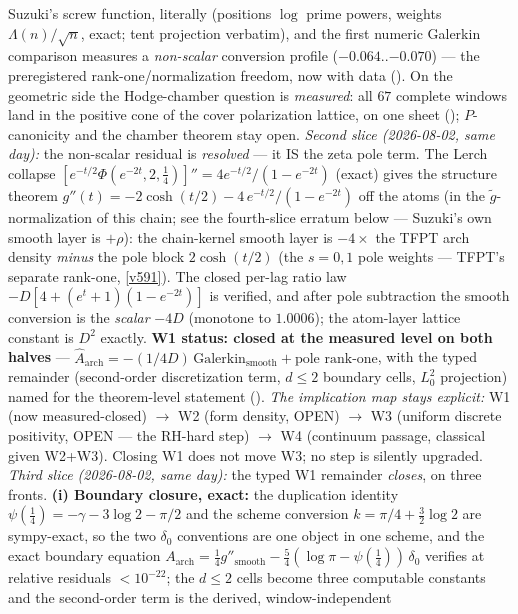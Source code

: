 Suzuki's screw function, literally (positions $\log$ prime powers,
weights $\Lambda(n)/\sqrt n$, exact; tent projection verbatim), and
the first numeric Galerkin comparison measures a \emph{non-scalar}
conversion profile ($-0.064..{-0.070}$) --- the preregistered
rank-one/normalization freedom, now with data
().  On the geometric side the
Hodge-chamber question is \emph{measured}: all $67$ complete windows
land in the positive cone of the cover polarization lattice, on one
sheet (); $P$-canonicity and the chamber
theorem stay open.
\emph{Second slice (2026-08-02, same day):} the non-scalar residual is
\emph{resolved} --- it IS the zeta pole term.  The Lerch collapse
$[e^{-t/2}\Phi(e^{-2t},2,\tfrac14)]''=4e^{-t/2}/(1-e^{-2t})$ (exact)
gives the structure theorem $g''(t)=-2\cosh(t/2)-4\,e^{-t/2}/(1-e^{-2t})$
off the atoms (in the $\tilde g$-normalization of this chain; see the
fourth-slice erratum below --- Suzuki's own smooth layer is $+\rho$):
the chain-kernel smooth layer is $-4\times$ the TFPT arch
density \emph{minus} the pole block $2\cosh(t/2)$ (the $s=0,1$ pole
weights --- TFPT's separate rank-one, \vref{v591}).  The closed
per-lag ratio law $-D[4+(e^t{+}1)(1-e^{-2t})]$ is verified, and after
pole subtraction the smooth conversion is the \emph{scalar} $-4D$
(monotone to $1.0006$); the atom-layer lattice constant is $D^2$
exactly.  \textbf{W1 status: closed at the measured level on both
halves} --- $\widehat A_{\mathrm{arch}} = -(1/4D)\,
\mathrm{Galerkin}_{\mathrm{smooth}} + \text{pole rank-one}$, with the
typed remainder (second-order discretization term, $d\le2$ boundary
cells, $L^2_0$ projection) named for the theorem-level statement
().  \emph{The implication map stays
explicit:} W1 (now measured-closed) $\to$ W2 (form density, OPEN) $\to$
W3 (uniform discrete positivity, OPEN --- the RH-hard step) $\to$ W4
(continuum passage, classical given W2+W3).  Closing W1 does not move
W3; no step is silently upgraded.
\emph{Third slice (2026-08-02, same day):} the typed W1 remainder
\emph{closes}, on three fronts.  \textbf{(i) Boundary closure, exact:}
the duplication identity $\psi(\tfrac14)=-\gamma-3\log2-\pi/2$ and the
scheme conversion $k=\pi/4+\tfrac32\log2$ are sympy-exact, so the two
$\delta_0$ conventions are one object in one scheme, and the exact
boundary equation $A_{\mathrm{arch}}=\tfrac14 g''_{\mathrm{smooth}}
-\tfrac54(\log\pi-\psi(\tfrac14))\,\delta_0$ verifies at relative
residuals $<10^{-22}$; the $d\le2$ cells become three computable
constants and the second-order term is the derived, window-independent
